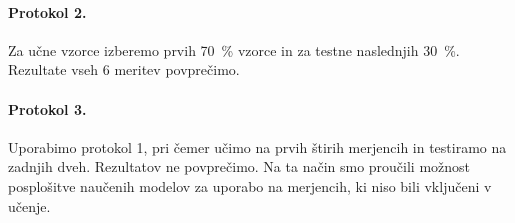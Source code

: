 \paragraph{Protokol 2.}
Za učne vzorce izberemo prvih \SI{70}{\%} vzorce in za testne naslednjih \SI{30}{\%}. Rezultate vseh 6 meritev povprečimo.

\paragraph{Protokol 3.}
Uporabimo protokol 1, pri čemer učimo na prvih štirih merjencih in testiramo na zadnjih dveh. Rezultatov ne povprečimo. Na ta način smo proučili možnost posplošitve naučenih modelov za uporabo na merjencih, ki niso bili vključeni v učenje.

